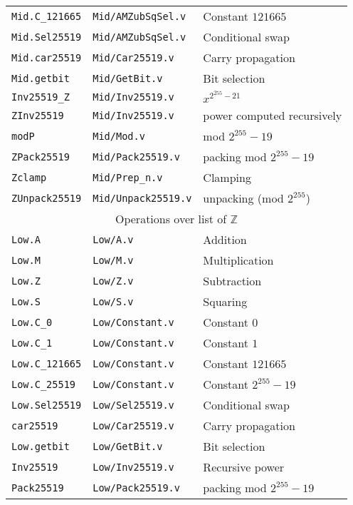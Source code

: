 \documentclass[8pt]{extarticle}
\newcommand{\p}{\ensuremath{2^{255}-19}}
\newcommand{\Z}{\ensuremath{\mathbb{Z}}\xspace}
\begin{document}
\begin{table*}[h]
\begin{tabular}{ l | l | l }
    \texttt{Mid.C\_121665} & \texttt{Mid/AMZubSqSel.v} & Constant $121665$ \\
    \texttt{Mid.Sel25519} & \texttt{Mid/AMZubSqSel.v} & Conditional swap \\
    \texttt{Mid.car25519} & \texttt{Mid/Car25519.v} & Carry propagation \\
    \texttt{Mid.getbit} & \texttt{Mid/GetBit.v} & Bit selection \\
    \texttt{Inv25519\_Z} & \texttt{Mid/Inv25519.v} & $x^{2^{255}-21}$ \\
    \texttt{ZInv25519} & \texttt{Mid/Inv25519.v} & power computed recursively \\
    \texttt{modP} & \texttt{Mid/Mod.v} & mod \p\\
    \texttt{ZPack25519} & \texttt{Mid/Pack25519.v} & packing mod \p\\
    \texttt{Zclamp} & \texttt{Mid/Prep\_n.v} & Clamping \\
    \texttt{ZUnpack25519} & \texttt{Mid/Unpack25519.v} & unpacking (mod $2^{255}$)\\
    \hline
    \multicolumn{3}{c}{Operations over list of \Z}\\
    \hline
    \texttt{Low.A} & \texttt{Low/A.v} & Addition \\
    \texttt{Low.M} & \texttt{Low/M.v} & Multiplication \\
    \texttt{Low.Z} & \texttt{Low/Z.v} & Subtraction \\
    \texttt{Low.S} & \texttt{Low/S.v} & Squaring \\
    \texttt{Low.C\_0} & \texttt{Low/Constant.v} & Constant $0$ \\
    \texttt{Low.C\_1} & \texttt{Low/Constant.v} & Constant $1$\\
    \texttt{Low.C\_121665} & \texttt{Low/Constant.v} & Constant $121665$\\
    \texttt{Low.C\_25519} & \texttt{Low/Constant.v} & Constant $2^{255}-19$\\
    \texttt{Low.Sel25519} & \texttt{Low/Sel25519.v} & Conditional swap \\
    \texttt{car25519} & \texttt{Low/Car25519.v} & Carry propagation \\
    \texttt{Low.getbit} & \texttt{Low/GetBit.v} & Bit selection \\
    \texttt{Inv25519} & \texttt{Low/Inv25519.v} & Recursive power \\
    \texttt{Pack25519} & \texttt{Low/Pack25519.v} & packing mod \p\\

\end{tabular}
\end{table*}
\end{document}
